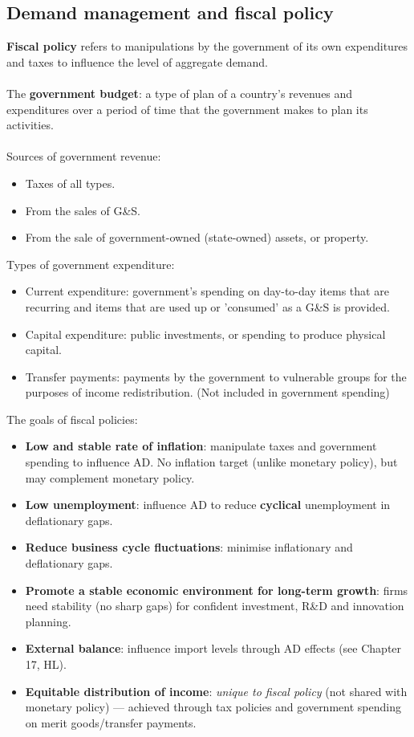 \documentclass[a4paper,12pt]{article}
\newcommand{\needbold}[1]{\textcolor{red!70!black}{\textbf{#1}}}
\begin{document}
\subsection{Demand management and fiscal policy}
\needbold{Fiscal policy} refers to manipulations by the government of its own expenditures and taxes to influence the level of aggregate demand.\\\\
The \needbold{government budget}: a type of plan of a country's revenues and expenditures over a period of time that the government makes to plan its activities.\\\\
Sources of government revenue:
\begin{itemize}
  \item Taxes of all types.
  \item From the sales of G\&S.
  \item From the sale of government-owned (state-owned) assets, or property.
\end{itemize}
Types of government expenditure:
\begin{itemize}
  \item Current expenditure: government's spending on day-to-day items that are recurring and items that are used up or 'consumed' as a G\&S is provided. 
  \item Capital expenditure: public investments, or spending to produce physical capital.
  \item Transfer payments:  payments by the government to vulnerable groups for the purposes of income redistribution. (Not included in government spending)
\end{itemize}
The goals of fiscal policies:
\begin{itemize}
  \item \textbf{Low and stable rate of inflation}: manipulate taxes and government spending to influence AD. No inflation target (unlike monetary policy), but may complement monetary policy.
  \item \textbf{Low unemployment}: influence AD to reduce \textbf{cyclical} unemployment in deflationary gaps.
  \item \textbf{Reduce business cycle fluctuations}: minimise inflationary and deflationary gaps.
  \item \textbf{Promote a stable economic environment for long-term growth}: firms need stability (no sharp gaps) for confident investment, R\&D and innovation planning.
  \item \textbf{External balance}: influence import levels through AD effects (see Chapter 17, HL).
  \item \textbf{Equitable distribution of income}: \textit{unique to fiscal policy} (not shared with monetary policy) --- achieved through tax policies and government spending on merit goods/transfer payments.
\end{itemize}
\end{document}
